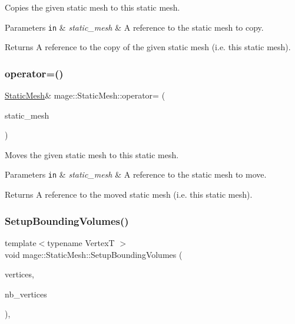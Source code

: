 Copies the given static mesh to this static mesh.


\begin{DoxyParams}[1]{Parameters}
\mbox{\tt in}  & {\em static\+\_\+mesh} & A reference to the static mesh to copy. \\
\hline
\end{DoxyParams}
\begin{DoxyReturn}{Returns}
A reference to the copy of the given static mesh (i.\+e. this static mesh). 
\end{DoxyReturn}
\hypertarget{classmage_1_1_static_mesh_a38912f8555053abba649bea160d56e46}{}\label{classmage_1_1_static_mesh_a38912f8555053abba649bea160d56e46} 
\subsubsection{\texorpdfstring{operator=()}{operator=()}\hspace{0.1cm}{\footnotesize\ttfamily [2/2]}}
{\footnotesize\ttfamily \hyperlink{classmage_1_1_static_mesh}{Static\+Mesh}\& mage\+::\+Static\+Mesh\+::operator= (\begin{DoxyParamCaption}\item[{\hyperlink{classmage_1_1_static_mesh}{Static\+Mesh} \&\&}]{static\+\_\+mesh }\end{DoxyParamCaption})\hspace{0.3cm}{\ttfamily [delete]}}

Moves the given static mesh to this static mesh.


\begin{DoxyParams}[1]{Parameters}
\mbox{\tt in}  & {\em static\+\_\+mesh} & A reference to the static mesh to move. \\
\hline
\end{DoxyParams}
\begin{DoxyReturn}{Returns}
A reference to the moved static mesh (i.\+e. this static mesh). 
\end{DoxyReturn}
\hypertarget{classmage_1_1_static_mesh_a532dcf96ac9b1bf7988a0726d1eb2fe5}{}\label{classmage_1_1_static_mesh_a532dcf96ac9b1bf7988a0726d1eb2fe5} 
\subsubsection{\texorpdfstring{Setup\+Bounding\+Volumes()}{SetupBoundingVolumes()}}
{\footnotesize\ttfamily template$<$typename VertexT $>$ \\
void mage\+::\+Static\+Mesh\+::\+Setup\+Bounding\+Volumes (\begin{DoxyParamCaption}\item[{const VertexT $\ast$}]{vertices,  }\item[{size\+\_\+t}]{nb\+\_\+vertices }\end{DoxyParamCaption})\hspace{0.3cm}{\ttfamily [private]}, {\ttfamily [noexcept]}}

